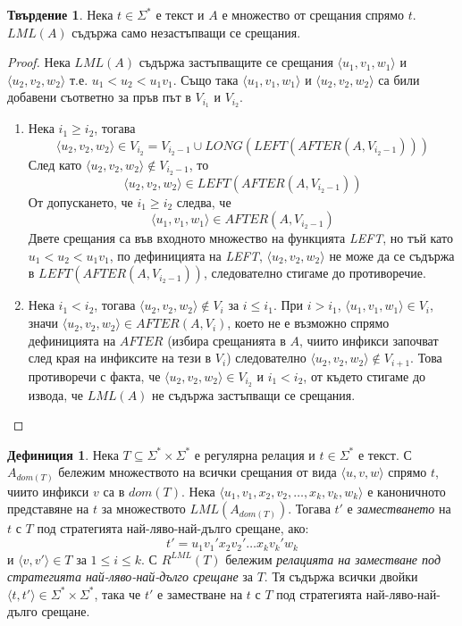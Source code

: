 \documentclass[12pt, oneside]{article}
\theoremstyle{definition}
\newtheorem{definition}{Дефиниция}[section]
\newtheorem{proposition}{Твърдение}[section]
\begin{document}
\begin{proposition}
	Нека \( t \in \Sigma^* \) е текст и \(A\) е множество от срещания спрямо \(t\). \( LML(A) \) съдържа само незастъпващи се срещания.

	\begin{proof}
		Нека \( LML(A) \) съдържа застъпващите се срещания \( \langle u_1, v_1, w_1 \rangle \) и \( \langle u_2, v_2, w_2 \rangle \) т.е. \( u_1 < u_2 < u_1v_1 \). Също така \( \langle u_1, v_1, w_1 \rangle \) и \( \langle u_2, v_2, w_2 \rangle \) са били добавени съответно за пръв път в \( V_{i_1} \text{ и } V_{i_2} \).
		\begin{enumerate}
			\item Нека \( i_1 \geq i_2 \), тогава
			\[ \langle u_2, v_2, w_2 \rangle \in V_{i_2} = V_{i_2-1} \cup LONG(LEFT(AFTER(A, V_{i_2-1}))) \]
			\noindent След като \( \langle u_2, v_2, w_2 \rangle \notin V_{i_2-1} \), то 
			\[ \langle u_2, v_2, w_2 \rangle \in LEFT(AFTER(A, V_{i_2-1})) \]
			От допускането, че \( i_1 \geq i_2 \) следва, че 
			\[ \langle u_1, v_1, w_1 \rangle \in AFTER(A,V_{i_2-1}) \]
			Двете срещания са във входното множество на функцията \emph{LEFT}, но тъй като \( u_1 < u_2 < u_1v_1 \), по дефиницията на \emph{LEFT}, \( \langle u_2, v_2, w_2 \rangle \) не може да се съдържа в \( LEFT(AFTER(A, V_{i_2-1})) \), следователно стигаме до противоречие.
			\item Нека \( i_1 < i_2 \), тогава \( \langle u_2, v_2, w_2 \rangle \notin V_i \) за \( i \leq i_1 \). При \( i > i_1 \), \( \langle u_1, v_1, w_1 \rangle \in V_i \), значи \( \langle u_2, v_2, w_2 \rangle \in AFTER(A, V_i) \), което не е възможно спрямо дефиницията на \( AFTER \) (избира срещанията в \(A\), чиито инфикси започват след края на инфиксите на тези в \(V_i\)) следователно \( \langle u_2, v_2, w_2 \rangle \notin V_{i+1} \). Това противоречи с факта, че \( \langle u_2, v_2, w_2 \rangle \in V_{i_2} \) и \(i_1 < i_2 \), от където стигаме до извода, че \( LML(A) \) не съдържа застъпващи се срещания.
		\end{enumerate}
	\end{proof}
\end{proposition}

\begin{definition}
	\label{def:RlmlT}
	Нека \( T \subseteq \Sigma^* \times \Sigma^* \) е регулярна релация и \( t \in \Sigma^* \) е текст. С \( A_{dom(T)} \) бележим множеството на всички срещания от вида \( \langle u,v,w \rangle \) спрямо \(t\), чиито инфикси \(v\) са в \(dom(T)\). Нека \( \langle u_1, v_1, x_2, v_2, \dots, x_k, v_k, w_k \rangle \) е каноничното представяне на \(t\) за множеството \( LML(A_{dom(T)}) \). Тогава \(t'\) е \emph{заместването} на \(t\) с \(T\) под стратегията най-ляво-най-дълго срещане, ако: 
	\[t' = u_1 v_1' x_2 v_2' \dots x_k v_k' w_k\] 
	и \( \langle v, v' \rangle \in T \) за \( 1 \leq i \leq k \). С \( R^{LML}(T) \) бележим \emph{релацията на заместване под стратегията най-ляво-най-дълго срещане} за \(T\). Тя съдържа всички двойки \( \langle t, t' \rangle \in \Sigma^* \times \Sigma^* \), така че \( t' \) е заместване на \( t \) с \(T\) под стратегията най-ляво-най-дълго срещане.
\end{definition}
\end{document}
